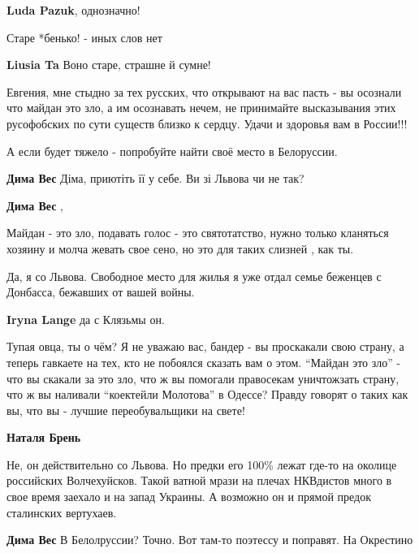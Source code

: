 \begin{itemize}
\begin{itemize}
\textbf{Luda Pazuk}, однозначно!
\end{itemize} %

Старе *бенько! - иных слов нет

\textbf{Liusia Ta} Воно старе, страшне й сумне!


Евгения, мне стыдно за тех русских, что открывают на вас пасть - вы осознали
что майдан это зло, а им осознавать нечем, не принимайте высказывания этих
русофобских по сути существ близко к сердцу. Удачи и здоровья вам в России!!!

А если будет тяжело - попробуйте найти своё место в Белоруссии.

\begin{itemize} %
\textbf{Дима Вес} Діма, приютіть її у себе. Ви зі Львова чи не так?

\textbf{Дима Вес} , 

Майдан - это зло, подавать голос - это святотатство, нужно только кланяться
хозяину и молча жевать свое сено, но это для таких слизней , как ты.


Да, я со Львова. Свободное место для жилья я уже отдал семье беженцев с
Донбасса, бежавших от вашей войны.

\textbf{Iryna Lange} да с Клязьмы он.


Тупая овца, ты о чём? Я не уважаю вас, бандер - вы проскакали свою страну, а
теперь гавкаете на тех, кто не побоялся сказать вам о этом. \enquote{Майдан это зло} -
что вы скакали за это зло, что ж вы помогали правосекам уничтожзать страну, что
ж вы наливали \enquote{коектейли Молотова} в Одессе? Правду говорят о таких как вы, что
вы - лучшие переобувальщики на свете!

\textbf{Наталя Брень} 

Не, он действительно со Львова. Но предки его 100\% лежат где-то на околице
российских Волчехуйсков. Такой ватной мрази на плечах НКВдистов много в свое
время заехало и на запад Украины. А возможно он и прямой предок сталинских
вертухаев.

\textbf{Дима Вес} В Белолруссии? Точно. Вот там-то поэтессу и поправят. На Окрестино
\end{itemize} %

\end{itemize} %

